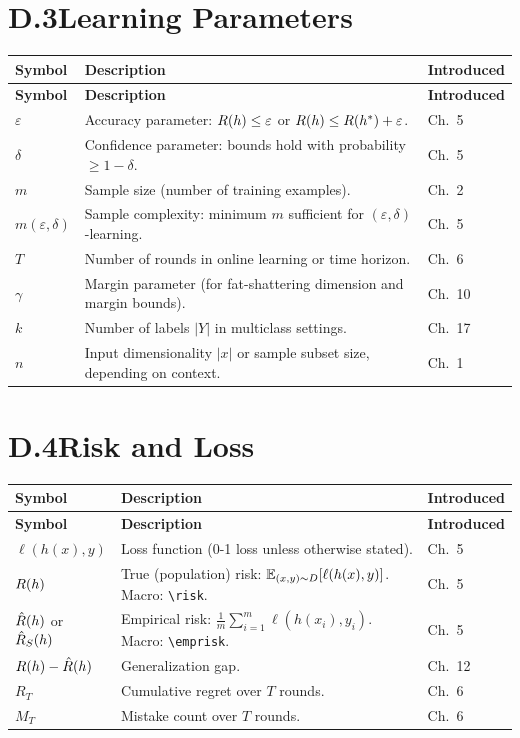\section*{D.3\quad Learning Parameters}
\label{sec:notation-params}

\begin{longtable}{lp{7.5cm}l}
\toprule
\textbf{Symbol} & \textbf{Description} & \textbf{Introduced} \\
\midrule
\endfirsthead
\toprule
\textbf{Symbol} & \textbf{Description} & \textbf{Introduced} \\
\midrule
\endhead
\bottomrule
\endlastfoot
$\varepsilon$ & Accuracy parameter: $R(h) \leq \varepsilon$ or $R(h) \leq R(h^*) + \varepsilon$. & Ch.~5 \\
$\delta$ & Confidence parameter: bounds hold with probability $\geq 1 - \delta$. & Ch.~5 \\
$m$ & Sample size (number of training examples). & Ch.~2 \\
$m(\varepsilon, \delta)$ & Sample complexity: minimum $m$ sufficient for $(\varepsilon, \delta)$-learning. & Ch.~5 \\
$T$ & Number of rounds in online learning or time horizon. & Ch.~6 \\
$\gamma$ & Margin parameter (for fat-shattering dimension and margin bounds). & Ch.~10 \\
$k$ & Number of labels $|Y|$ in multiclass settings. & Ch.~17 \\
$n$ & Input dimensionality $|x|$ or sample subset size, depending on context. & Ch.~1 \\
\end{longtable}

\section*{D.4\quad Risk and Loss}
\label{sec:notation-risk}

\begin{longtable}{lp{7.5cm}l}
\toprule
\textbf{Symbol} & \textbf{Description} & \textbf{Introduced} \\
\midrule
\endfirsthead
\toprule
\textbf{Symbol} & \textbf{Description} & \textbf{Introduced} \\
\midrule
\endhead
\bottomrule
\endlastfoot
$\ell(h(x), y)$ & Loss function (0-1 loss unless otherwise stated). & Ch.~5 \\
$R(h)$ & True (population) risk: $\mathbb{E}_{(x,y) \sim D}[\ell(h(x),y)]$. Macro: \verb|\risk|. & Ch.~5 \\
$\hat{R}(h)$ or $\hat{R}_S(h)$ & Empirical risk: $\frac{1}{m}\sum_{i=1}^m \ell(h(x_i),y_i)$. Macro: \verb|\emprisk|. & Ch.~5 \\
$R(h) - \hat{R}(h)$ & Generalization gap. & Ch.~12 \\
$R_T$ & Cumulative regret over $T$ rounds. & Ch.~6 \\
$M_T$ & Mistake count over $T$ rounds. & Ch.~6 \\
\end{longtable}

